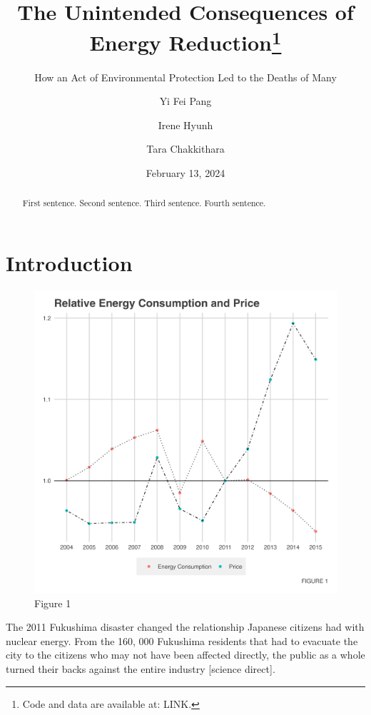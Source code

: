 \documentclass[
]{article}
\title{The Unintended Consequences of Energy Reduction\thanks{Code and
data are available at: LINK.}}
\subtitle{How an Act of Environmental Protection Led to the Deaths of
Many}
\author{Yi Fei Pang \and Irene Hyunh \and Tara Chakkithara}
\date{February 13, 2024}
\begin{document}
\maketitle
\begin{abstract}
First sentence. Second sentence. Third sentence. Fourth sentence.
\end{abstract}
\ifdefined\Shaded\renewenvironment{Shaded}{\begin{tcolorbox}[breakable, interior hidden, frame hidden, enhanced, borderline west={3pt}{0pt}{shadecolor}, boxrule=0pt, sharp corners]}{\end{tcolorbox}}\fi

\hypertarget{introduction}{%
\section{Introduction}\label{introduction}}

\begin{figure}

{\centering \includegraphics{../other/figures/figure1.png}

}

\caption{Figure 1}

\end{figure}

The 2011 Fukushima disaster changed the relationship Japanese citizens
had with nuclear energy. From the 160, 000 Fukushima residents that had
to evacuate the city to the citizens who may not have been affected
directly, the public as a whole turned their backs against the entire
industry {[}science direct{]}.
\end{document}
